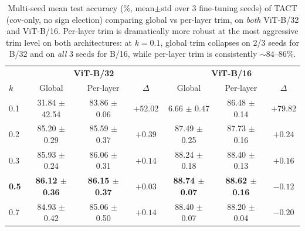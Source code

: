 \begin{table}[h]
\caption{Multi-seed mean test accuracy (\%, mean$\pm$std over 3 fine-tuning seeds) of TACT (cov-only, no sign election) comparing global vs per-layer trim, on \emph{both} ViT-B/32 and ViT-B/16. Per-layer trim is dramatically more robust at the most aggressive trim level on both architectures: at $k=0.1$, global trim collapses on 2/3 seeds for B/32 and on \emph{all} 3 seeds for B/16, while per-layer trim is consistently $\sim 84$--$86\%$.}
\label{tab:perlayer}
\centering
\small
\begin{tabular}{lccc|ccc}
\toprule
 & \multicolumn{3}{c|}{\textbf{ViT-B/32}} & \multicolumn{3}{c}{\textbf{ViT-B/16}} \\
$k$ & Global & Per-layer & $\Delta$ & Global & Per-layer & $\Delta$ \\
\midrule
0.1 & 31.84 {\scriptsize $\pm$ 42.54} & 83.86 {\scriptsize $\pm$ 0.06} & $+52.02$ & 6.66 {\scriptsize $\pm$ 0.47} & 86.48 {\scriptsize $\pm$ 0.14} & $+79.82$ \\
0.2 & 85.20 {\scriptsize $\pm$ 0.29} & 85.59 {\scriptsize $\pm$ 0.37} & $+0.39$  & 87.49 {\scriptsize $\pm$ 0.25} & 87.73 {\scriptsize $\pm$ 0.16} & $+0.24$ \\
0.3 & 85.93 {\scriptsize $\pm$ 0.24} & 86.06 {\scriptsize $\pm$ 0.31} & $+0.14$  & 88.24 {\scriptsize $\pm$ 0.18} & 88.40 {\scriptsize $\pm$ 0.13} & $+0.16$ \\
\textbf{0.5} & \textbf{86.12 {\scriptsize $\pm$ 0.36}} & \textbf{86.15 {\scriptsize $\pm$ 0.37}} & $+0.03$ & \textbf{88.74 {\scriptsize $\pm$ 0.07}} & \textbf{88.62 {\scriptsize $\pm$ 0.16}} & $-0.12$ \\
0.7 & 84.93 {\scriptsize $\pm$ 0.42} & 85.06 {\scriptsize $\pm$ 0.50} & $+0.14$  & 88.40 {\scriptsize $\pm$ 0.07} & 88.20 {\scriptsize $\pm$ 0.04} & $-0.20$ \\
\bottomrule
\end{tabular}
\end{table}
